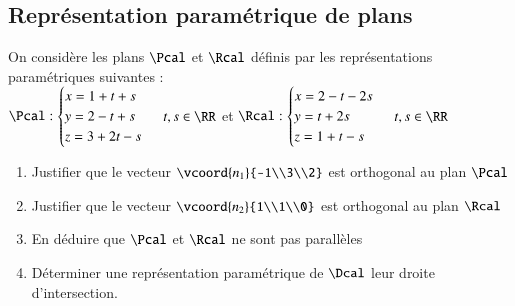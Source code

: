 \documentclass[oneside,12pt]{article}          %
\begin{document}
\subsection{Représentation paramétrique de plans}
On considère les plans $\Pcal$ et $\Rcal$ définis par les représentations paramétriques suivantes :\\[5pt]
$\Pcal : \begin{cases}x=1+t+s\\y=2-t+s\\z=3+2t-s\end{cases}$ $t,s\in\RR$ \hspace{2cm} et \hspace{2cm} $\Rcal : \begin{cases}x=2-t-2s\\y=t+2s\\z=1+t-s\end{cases}$ $t,s\in\RR$
\begin{enumerate}
    \item Justifier que le vecteur $\vcoord{n_1}{-1\\3\\2}$ est orthogonal au plan $\Pcal$
    \item Justifier que le vecteur $\vcoord{n_2}{1\\1\\0}$ est orthogonal au plan $\Rcal$
    \item En déduire que $\Pcal$ et $\Rcal$ ne sont pas parallèles
    \item Déterminer une représentation paramétrique de $\Dcal$ leur droite d'intersection.
\end{enumerate}
\end{document}

